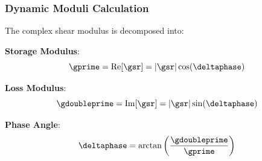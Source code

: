 \subsubsection{Dynamic Moduli Calculation}
The complex shear modulus is decomposed into:

\textbf{Storage Modulus}:
\begin{equation}
\gprime = \text{Re}[\gsr] = |\gsr| \cos(\deltaphase)
\end{equation}

\textbf{Loss Modulus}:
\begin{equation}
\gdoubleprime = \text{Im}[\gsr] = |\gsr| \sin(\deltaphase)
\end{equation}

\textbf{Phase Angle}:
\begin{equation}
\deltaphase = \arctan\left(\frac{\gdoubleprime}{\gprime}\right)
\end{equation}
